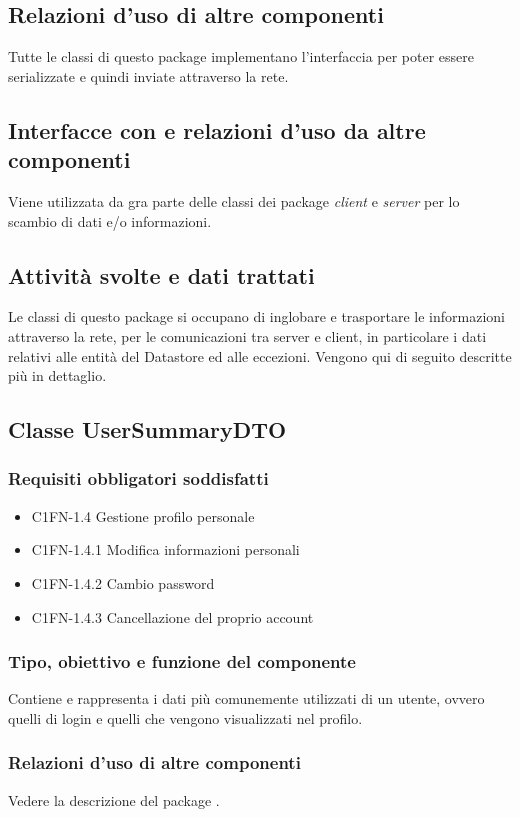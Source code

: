 \subsection*{Relazioni d'uso di altre componenti} Tutte le classi di questo
package implementano l'interfaccia  per poter essere
serializzate e quindi inviate attraverso la rete. 
\subsection*{Interfacce con e relazioni d'uso da altre componenti} Viene
utilizzata da gra parte delle classi dei package \emph{client} e \emph{server}
per lo scambio di dati e/o informazioni. 
\subsection*{Attivit\`a svolte e dati trattati}
Le classi di questo package si occupano di inglobare e trasportare
le informazioni attraverso la rete, per le comunicazioni tra server e client,
in particolare i dati relativi alle entit\`a del Datastore ed alle eccezioni.
Vengono qui di seguito descritte pi\`u in dettaglio.

\subsection{Classe UserSummaryDTO}
\subsubsection*{Requisiti obbligatori soddisfatti}
\begin{itemize}
	\item C1FN-1.4 Gestione profilo personale
	\item C1FN-1.4.1 Modifica informazioni personali
	\item C1FN-1.4.2 Cambio password
	\item C1FN-1.4.3 Cancellazione del proprio account
\end{itemize}
\subsubsection*{Tipo, obiettivo e funzione del componente}
Contiene e rappresenta i dati pi\`u comunemente utilizzati di un utente, ovvero
quelli di login e quelli che vengono visualizzati nel profilo. 
\subsubsection*{Relazioni d'uso di altre componenti}
Vedere la descrizione del package .
